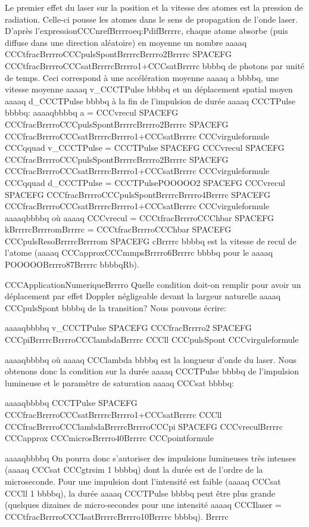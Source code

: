 Le premier effet du laser sur la position et la vitesse des atomes est la pression de radiation. Celle-ci pousse les atomes dans le sens de propagation de l'onde laser. D'après l'expressionCCCnrefBrrrroeq:PdifBrrrrc, chaque atome absorbe (puis diffuse dans une direction aléatoire) en moyenne  un nombre 
aaaaq CCCtfracBrrrroCCCpulsSpontBrrrrcBrrrro2Brrrrc SPACEFG CCCtfracBrrrroCCCsatBrrrrcBrrrro1+CCCsatBrrrrc bbbbq
de photons par unité de temps. Ceci correspond à une accélération moyenne aaaaq a bbbbq, une vitesse moyenne aaaaq v_CCCTPulse bbbbq et un déplacement spatial moyen aaaaq d_CCCTPulse bbbbq à la fin de l'impulsion de durée aaaaq CCCTPulse bbbbq:
aaaaqbbbbq
	a = CCCvrecul  SPACEFG  CCCfracBrrrroCCCpulsSpontBrrrrcBrrrro2Brrrrc SPACEFG CCCfracBrrrroCCCsatBrrrrcBrrrro1+CCCsatBrrrrc
CCCvirguleformule
CCCqquad
	v_CCCTPulse = CCCTPulse  SPACEFG  CCCvrecul  SPACEFG  CCCfracBrrrroCCCpulsSpontBrrrrcBrrrro2Brrrrc SPACEFG CCCfracBrrrroCCCsatBrrrrcBrrrro1+CCCsatBrrrrc 
CCCvirguleformule
CCCqquad
	d_CCCTPulse = CCCTPulsePOOOOO2  SPACEFG  CCCvrecul  SPACEFG  CCCfracBrrrroCCCpulsSpontBrrrrcBrrrro4Brrrrc SPACEFG CCCfracBrrrroCCCsatBrrrrcBrrrro1+CCCsatBrrrrc 
CCCvirguleformule
aaaaqbbbbq
où aaaaq CCCvrecul = CCCtfracBrrrroCCChbar SPACEFG kBrrrrcBrrrromBrrrrc = CCCtfracBrrrroCCChbar SPACEFG CCCpulsResoBrrrrcBrrrrom SPACEFG cBrrrrc bbbbq est la vitesse de recul de l'atome (aaaaq CCCapproxCCCmmpsBrrrro6Brrrrc bbbbq pour le aaaaq POOOOOBrrrro87Brrrrc bbbbqRb).

CCCApplicationNumeriqueBrrrro
Quelle condition doit-on remplir pour avoir un déplacement par effet Doppler négligeable devant la largeur naturelle aaaaq CCCpulsSpont bbbbq de la transition? Nous pouvons écrire:

aaaaqbbbbq
v_CCCTPulse SPACEFG CCCfracBrrrro2 SPACEFG CCCpiBrrrrcBrrrroCCClambdaBrrrrc CCCll CCCpulsSpont
CCCvirguleformule

aaaaqbbbbq
où aaaaq CCClambda bbbbq est la longueur d'onde du laser. Nous obtenons donc la condition sur la durée aaaaq CCCTPulse bbbbq de l'impulsion lumineuse et le paramètre de saturation aaaaq CCCsat bbbbq:

aaaaqbbbbq
CCCTPulse  SPACEFG CCCfracBrrrroCCCsatBrrrrcBrrrro1+CCCsatBrrrrc CCCll CCCfracBrrrroCCClambdaBrrrrcBrrrroCCCpi SPACEFG CCCvreculBrrrrc CCCapprox CCCmicrosBrrrro40Brrrrc
CCCpointformule

aaaaqbbbbq
On pourra donc s'autoriser des impulsions lumineuses très intenses (aaaaq CCCsat CCCgtrsim 1 bbbbq) dont la durée est de l'ordre de la microseconde. Pour une impulsion dont l'intensité est faible (aaaaq CCCsat CCCll 1 bbbbq), la durée aaaaq CCCTPulse bbbbq peut être plus grande (quelques dizaines de micro-secondes pour une intensité aaaaq CCCIlaser = CCCtfracBrrrroCCCIsatBrrrrcBrrrro10Brrrrc bbbbq).
Brrrrc


